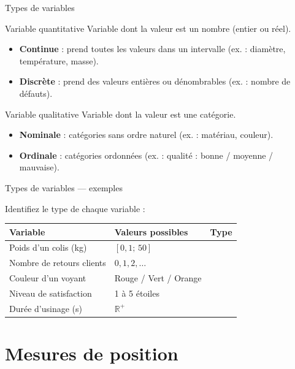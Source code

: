 \documentclass{BeamerTemplate}
\begin{document}
\begin{frame}[t]{Types de variables}

\begin{Boite}{Variable quantitative}
Variable dont la valeur est un nombre (entier ou réel).
\begin{itemize}
  \item \textbf{Continue} : prend toutes les valeurs dans un intervalle (ex. : diamètre, température, masse).
  \item \textbf{Discrète} : prend des valeurs entières ou dénombrables (ex. : nombre de défauts).
\end{itemize}
\end{Boite}

\medskip

\begin{Boite}{Variable qualitative}
Variable dont la valeur est une catégorie.
\begin{itemize}
  \item \textbf{Nominale} : catégories sans ordre naturel (ex. : matériau, couleur).
  \item \textbf{Ordinale} : catégories ordonnées (ex. : qualité : bonne / moyenne / mauvaise).
\end{itemize}
\end{Boite}

\end{frame}

\begin{frame}[t]{Types de variables — exemples}

Identifiez le type de chaque variable :

\bigskip
\begin{tabular}{lll}
\hline
Variable & Valeurs possibles & Type \\ \hline
Poids d'un colis (kg) & $[0{,}1;\, 50]$ & \\[4pt]
Nombre de retours clients & $0, 1, 2, \ldots$ & \\[4pt]
Couleur d'un voyant & Rouge / Vert / Orange & \\[4pt]
Niveau de satisfaction & 1 à 5 étoiles & \\[4pt]
Durée d'usinage (s) & $\mathbb{R}^+$ & \\[4pt]
\hline
\end{tabular}

\end{frame}

\section{Mesures de position}
\end{document}
